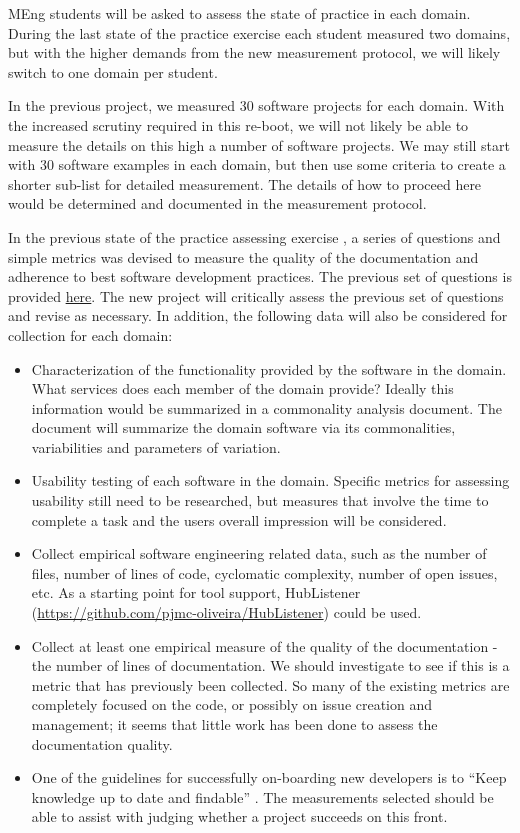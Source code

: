 \documentclass[12pt]{article}
\begin{document}
MEng students will be asked to assess the state of practice in each domain.
During the last state of the practice exercise each student measured two
domains, but with the higher demands from the new measurement protocol, we will
likely switch to one domain per student.

In the previous project, we measured 30 software projects for each domain.  With
the increased scrutiny required in this re-boot, we will not likely be able to
measure the details on this high a number of software projects.  We may still
start with 30 software examples in each domain, but then use some criteria to
create a shorter sub-list for detailed measurement.  The details of how to
proceed here would be determined and documented in the measurement protocol.

In the previous state of the practice assessing exercise
\citep{SmithEtAl2018_arXivGIS}, a series of questions and simple metrics was
devised to measure the quality of the documentation and adherence to best
software development practices.  The previous set of questions is provided
\href{https://github.com/adamlazz/DomainX/blob/master/TemplateToGradeSCSoft.pdf}
{here}. The new project will critically assess the previous set of questions and
revise as necessary.  In addition, the following data will also be considered
for collection for each domain:

\begin{itemize}
\item Characterization of the functionality provided by the software in the
  domain.  What services does each member of the domain provide?  Ideally this
  information would be summarized in a commonality analysis document.  The
  document will summarize the domain software via its commonalities,
  variabilities and parameters of variation.
\item Usability testing of each software in the domain.  Specific metrics for
  assessing usability still need to be researched, but measures that involve the
  time to complete a task and the users overall impression will be considered.
\item Collect empirical software engineering related data, such as the number of
  files, number of lines of code, cyclomatic complexity, number of open issues,
  etc.  As a starting point for tool support, HubListener
  (\url{https://github.com/pjmc-oliveira/HubListener}) could be used.
\item Collect at least one empirical measure of the quality of the documentation
  - the number of lines of documentation.  We should investigate to see if this
  is a metric that has previously been collected.  So many of the existing
  metrics are completely focused on the code, or possibly on issue creation and
  management; it seems that little work has been done to assess the
  documentation quality.
\item One of the guidelines for successfully on-boarding new developers is to
  ``Keep knowledge up to date and findable'' \citep{ShollerEtAl2019}.  The
  measurements selected should be able to assist with judging whether a project
  succeeds on this front.
\end{itemize}
\end{document}
